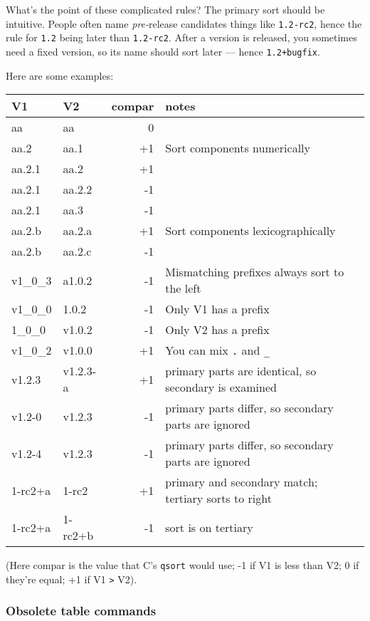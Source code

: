 \documentclass{article}
\newcommand{\code}[1]{\texttt{#1}}
\begin{document}
What's the point of these complicated rules?  The primary sort should be
intuitive.  People often name \emph{pre-}release candidates things like
\code{1.2-rc2}, hence the rule for \code{1.2} being later than \code{1.2-rc2}.
After a version is released, you sometimes need a fixed version, so its
name should sort later --- hence \code{1.2+bugfix}.

Here are some examples:

\begin{tabular}{l|l|r|l}%
V1 & V2 & compar & notes \\
\hline
aa & aa & 0 & \\
aa.2 & aa.1 & +1 & Sort components numerically \\
aa.2.1 & aa.2 & +1 & \\
aa.2.1 & aa.2.2 & -1 & \\
aa.2.1 & aa.3 & -1 & \\
aa.2.b & aa.2.a & +1 & Sort components lexicographically \\
aa.2.b & aa.2.c & -1 & \\
v1\_0\_3 & a1.0.2 & -1 & Mismatching prefixes always sort to the left \\
v1\_0\_0 & 1.0.2 & -1 & Only V1 has a prefix \\
1\_0\_0 & v1.0.2 & -1 & Only V2 has a prefix\\
v1\_0\_2 & v1.0.0 & +1 & You can mix \code{.} and \code{\_} \\
v1.2.3 & v1.2.3-a & +1 & primary parts are identical, so secondary is examined \\
v1.2-0 & v1.2.3 & -1 & primary parts differ, so secondary parts are ignored \\
v1.2-4 & v1.2.3 & -1 & primary parts differ, so secondary parts are ignored \\
1-rc2+a & 1-rc2 & +1 & primary and secondary match; tertiary sorts to right \\
1-rc2+a & 1-rc2+b & -1 & sort is on tertiary \\
\end{tabular}

(Here compar is the value that C's \code{qsort} would use;  -1 if V1 is less
than V2; 0 if they're equal; +1 if V1 \code{>} V2).

\subsubsection{Obsolete table commands}
\end{document}
